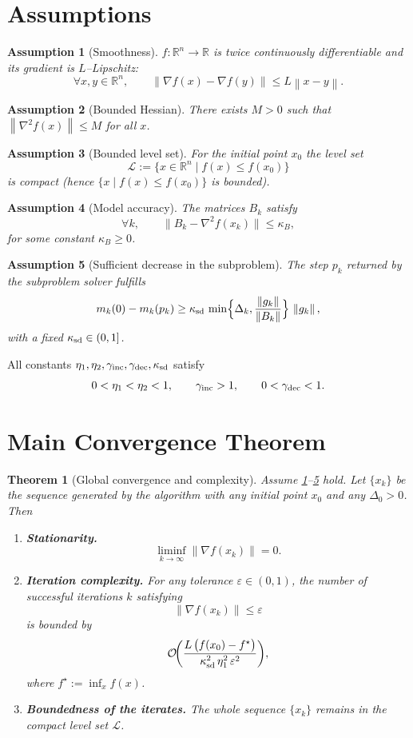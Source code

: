 \documentclass[11pt]{article}
\newtheorem{theorem}{Theorem}
\newtheorem{assumption}{Assumption}
\newcommand{\R}{\mathbb{R}}
\newcommand{\norm}[1]{\left\lVert#1\right\rVert}
\begin{document}
\section*{Assumptions}
\begin{assumption}[Smoothness]\label{as:smooth}
$f:\R^{n}\rightarrow\R$ is twice continuously differentiable and its gradient is $L$–Lipschitz:
\[
\forall x,y\in\R^{n},\qquad 
\norm{\nabla f(x)-\nabla f(y)}\le L\norm{x-y}.
\]
\end{assumption}
\begin{assumption}[Bounded Hessian]\label{as:hessian}
There exists $M>0$ such that $\norm{\nabla^{2}f(x)}\le M$ for all $x$.
\end{assumption}
\begin{assumption}[Bounded level set]\label{as:level}
For the initial point $x_{0}$ the level set
\[
\mathcal{L}:=\{x\in\R^{n}\mid f(x)\le f(x_{0})\}
\]
is compact (hence $\{x\mid f(x)\le f(x_{0})\}$ is bounded).
\end{assumption}
\begin{assumption}[Model accuracy]\label{as:model}
The matrices $B_{k}$ satisfy
\[
\forall k,\qquad 
\|B_{k}-\nabla^{2}f(x_{k})\|\le \kappa_{B},
\]
for some constant $\kappa_{B}\ge0$.
\end{assumption}
\begin{assumption}[Sufficient decrease in the subproblem]\label{as:suffdec}
The step $p_{k}$ returned by the subproblem solver fulfills
\[
m_{k}(0)-m_{k}(p_{k})\ge \kappa_{\rm sd}\,\min\!\Big\{\Delta_{k},\frac{\norm{g_{k}}}{\norm{B_{k}}}\Big\}\,\norm{g_{k}},
\]
with a fixed $\kappa_{\rm sd}\in(0,1]$.
\end{assumption}
All constants $\eta_{1},\eta_{2},\gamma_{\rm inc},\gamma_{\rm dec},\kappa_{\rm sd}$ satisfy
\[
0<\eta_{1}<\eta_{2}<1,\qquad \gamma_{\rm inc}>1,\qquad 0<\gamma_{\rm dec}<1.
\]

\section*{Main Convergence Theorem}
\begin{theorem}[Global convergence and complexity]\label{thm:global}
Assume \ref{as:smooth}–\ref{as:suffdec} hold. Let $\{x_{k}\}$ be the sequence generated by the algorithm with any initial point $x_{0}$ and any $\Delta_{0}>0$. Then
\begin{enumerate}[label=(\roman*)]
\item \textbf{Stationarity.} 
\[
\liminf_{k\to\infty}\norm{\nabla f(x_{k})}=0.
\]
\item \textbf{Iteration complexity.} 
For any tolerance $\varepsilon\in(0,1)$, the number of \emph{successful} iterations $k$ satisfying
\[
\norm{\nabla f(x_{k})}\le\varepsilon
\]
is bounded by
\[
\mathcal{O}\!\bigg(\frac{L\,\bigl(f(x_{0})-f^{\star}\bigr)}{\kappa_{\rm sd}^{2}\,\eta_{1}^{2}\,\varepsilon^{2}}\bigg),
\]
where $f^{\star}:=\inf_{x}f(x)$.
\item \textbf{Boundedness of the iterates.} The whole sequence $\{x_{k}\}$ remains in the compact level set $\mathcal{L}$.
\end{enumerate}
\end{theorem}
\end{document}
